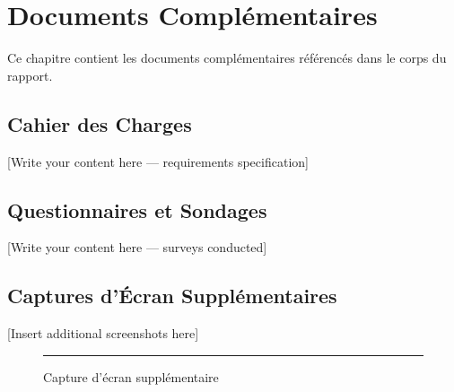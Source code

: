 
\chapter{Documents Complémentaires}
\label{app:supplementary}

Ce chapitre contient les documents complémentaires référencés dans le corps du rapport.

\section{Cahier des Charges}
\label{sec:cahier-charges}

[Write your content here — requirements specification]

\section{Questionnaires et Sondages}
\label{sec:surveys}

[Write your content here — surveys conducted]

\section{Captures d'Écran Supplémentaires}
\label{sec:extra-screenshots}

[Insert additional screenshots here]

\begin{figure}[H]
  \centering
  \rule{0.9\textwidth}{5cm} %
  \caption{Capture d'écran supplémentaire}
  \label{fig:appendix-screenshot1}
\end{figure}

